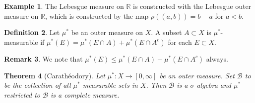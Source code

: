 \documentclass[11pt]{amsart}
\newtheorem{theorem}{Theorem}[section]
\theoremstyle{definition}
\newtheorem{definition}[theorem]{Definition}
\newtheorem{remark}[theorem]{Remark}
\newtheorem{example}[theorem]{Example}
\numberwithin{equation}{section}
\begin{document}
\begin{example}
    The Lebesgue measure on $\mathbb R$ is constructed with the Lebesgue outer measure on $\mathbb R$, which is constructed by the map $\rho((a,b))=b-a$ for $a<b$.
\end{example}
\begin{definition}
    Let $\mu^*$ be an outer measure on $X$. A subset $A\subset X$ is $\mu^*$-measurable if $\mu^*(E)=\mu^*(E\cap A)+\mu^*(E\cap A^c)$ for each $E\subset X$.
\end{definition}
\begin{remark}
    We note that $\mu^*(E)\le\mu^*(E\cap A)+\mu^*(E\cap A^c)$ always.
\end{remark}
\begin{theorem}[Carathéodory]\label{caratheodory}
    Let $\mu^*:X\to[0,\infty]$ be an outer measure. Set $\mathcal B$ to be the collection of all $\mu^*$-measurable sets in $X$. Then $\mathcal B$ is a $\sigma$-algebra and $\mu^*$ restricted to $\mathcal B$ is a complete measure.
\end{theorem}
\end{document}
